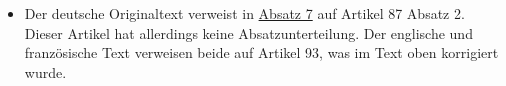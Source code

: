
\begin{itemize}

  \item Der deutsche Originaltext verweist in \hyperref[itm:28-7]{Absatz 7} auf Artikel 87 Absatz 2. Dieser Artikel hat
  allerdings keine Absatzunterteilung. Der englische und französische Text verweisen beide auf Artikel 93, was im Text
  oben korrigiert wurde.

\end{itemize}

